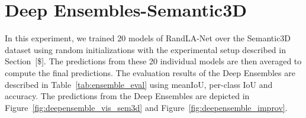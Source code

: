     \section{Deep Ensembles-Semantic3D}
    \label{sec:deepensemble_train}
    In this experiment, we trained 20 models of RandLA-Net over the Semantic3D dataset using random initializations with the experimental setup described in Section~[\$].
    The predictions from these 20 individual models are then averaged to compute the final predictions.
    The evaluation results of the Deep Ensembles are described in Table~\ref{tab:ensemble_eval} using meanIoU, per-class IoU and accuracy.
    The predictions from the Deep Ensembles are depicted in Figure~\ref{fig:deepensemble_vis_sem3d} and Figure~\ref{fig:deepensemble_improv}.
    \begin{table}[h!]
        \caption{Illustration of performance of RandLA-Net on Semantic3D over number of ensembles. meanIOU and IOU per-class and overall accuracy are represented here.
        C1 to C8 are the classes of Semantic3D which are Manmadeterrain, Naturalterrain, Highvegetation, Lowvegetation, Buildings, Hardscapes, Scanningartifacts, and Cars.}
        \label{tab:ensemble_eval}
    \end{table} 

